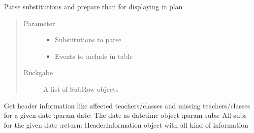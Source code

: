 \documentclass[letterpaper,10pt,ngerman]{sphinxmanual}
\begin{document}
\label{\detokenize{index:module-untisconnect.sub}}

\begin{fulllineitems}
\label{\detokenize{index:untisconnect.sub.generate_sub_table}}
Parse substitutions and prepare than for displaying in plan
\begin{quote}\begin{description}
\item[{Parameter}] \leavevmode\begin{itemize}
\item {} 
 \textendash{} Substitutions to parse

\item {} 
 \textendash{} Events to include in table

\end{itemize}

\item[{Rückgabe}] \leavevmode
A list of SubRow objects

\end{description}\end{quote}

\end{fulllineitems}


\begin{fulllineitems}
\label{\detokenize{index:untisconnect.sub.get_header_information}}
Get header information like affected teachers/classes and missing teachers/classes for a given date
:param date: The date as datetime object
:param subs: All subs for the given date
:return: HeaderInformation object with all kind of information

\end{fulllineitems}
\end{document}
